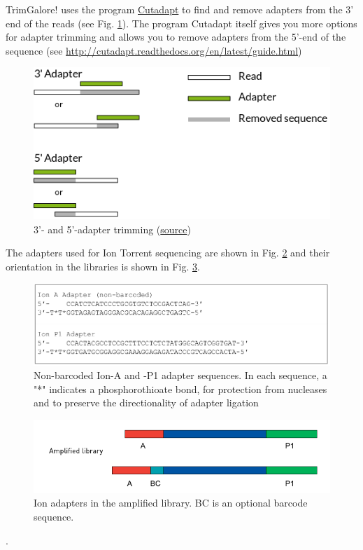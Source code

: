 \documentclass[11pt]{article}
\begin{document}
TrimGalore! uses the program \href{https://code.google.com/p/cutadapt/}{Cutadapt} to find and remove adapters from
the 3' end of the reads (see Fig. \ref{fig:adapters}). The program Cutadapt
itself gives you more options for adapter trimming and allows you to
remove adapters from the 5'-end of the sequence (see
\url{http://cutadapt.readthedocs.org/en/latest/guide.html})

\begin{figure}[htb]
\centering
\includegraphics[width=14cm]{adapters.png}
\caption{\label{fig:adapters}3'- and 5'-adapter trimming (\href{http://cutadapt.readthedocs.org/en/latest/guide.html}{source})}
\end{figure}


The adapters used for Ion Torrent sequencing are shown in
Fig. \ref{fig:ionadapters} and their orientation in the libraries is shown
in Fig. \ref{fig:adapterorientations}.

\begin{figure}[htb]
\centering
\includegraphics[width=14cm]{IonAdapters.png}
\caption{\label{fig:ionadapters}Non-barcoded Ion-A and -P1 adapter sequences. In each sequence, a "*" indicates a phosphorothioate bond, for protection from nucleases and to preserve the directionality of adapter ligation}
\end{figure}

\begin{figure}[htb]
\centering
\includegraphics[width=14cm]{IonLibraryWithAdapters.png}
\caption{\label{fig:adapterorientations}Ion adapters in the amplified library. BC is an optional barcode sequence.}
\end{figure}.
\end{document}
